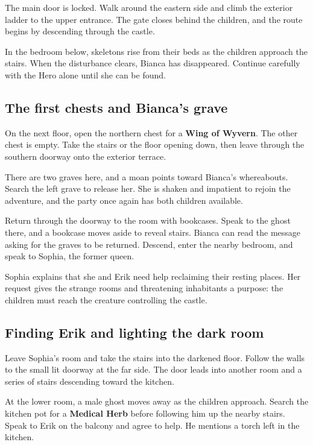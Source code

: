 The main door is locked. Walk around the eastern side and climb the
exterior ladder to the upper entrance. The gate closes behind the children,
and the route begins by descending through the castle.

In the bedroom below, skeletons rise from their beds as the children
approach the stairs. When the disturbance clears, Bianca has disappeared.
Continue carefully with the Hero alone until she can be found.

\subsection*{The first chests and Bianca's grave}

On the next floor, open the northern chest for a \textbf{Wing of Wyvern}.
The other chest is empty. Take the stairs or the floor opening down,
then leave through the southern doorway onto the exterior terrace.

There are two graves here, and a moan points toward Bianca's whereabouts.
Search the left grave to release her. She is shaken and impatient to
rejoin the adventure, and the party once again has both children available.

Return through the doorway to the room with bookcases. Speak to the ghost
there, and a bookcase moves aside to reveal stairs. Bianca can read the
message asking for the graves to be returned. Descend, enter the nearby
bedroom, and speak to Sophia, the former queen.

Sophia explains that she and Erik need help reclaiming their resting
places. Her request gives the strange rooms and threatening inhabitants
a purpose: the children must reach the creature controlling the castle.

\subsection*{Finding Erik and lighting the dark room}

Leave Sophia's room and take the stairs into the darkened floor. Follow
the walls to the small lit doorway at the far side. The door leads into
another room and a series of stairs descending toward the kitchen.

At the lower room, a male ghost moves away as the children approach.
Search the kitchen pot for a \textbf{Medical Herb} before following him
up the nearby stairs. Speak to Erik on the balcony and agree to help.
He mentions a torch left in the kitchen.

